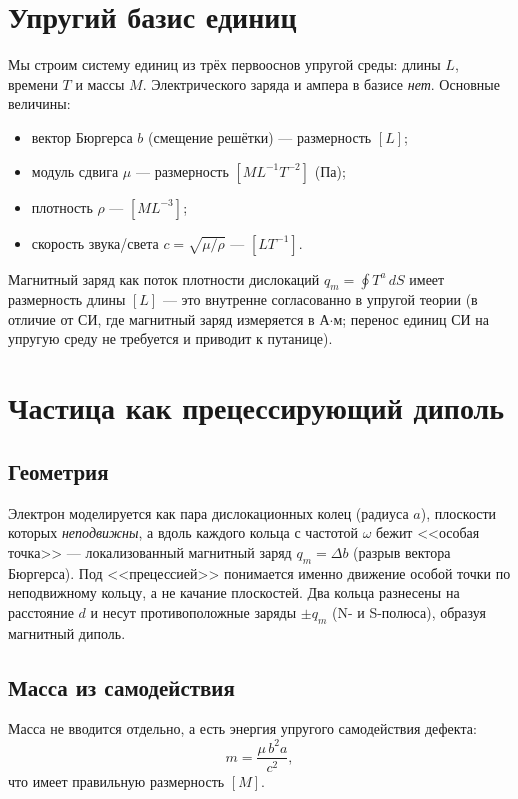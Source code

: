 \documentclass[12pt,a4paper]{article}
\begin{document}
\section{Упругий базис единиц}
\label{sec:units}
Мы строим систему единиц из трёх первооснов упругой среды: длины $L$, времени $T$
и массы $M$. Электрического заряда и ампера в базисе \emph{нет}. Основные величины:
\begin{itemize}[nosep]
\item вектор Бюргерса $b$ (смещение решётки) --- размерность $[L]$;
\item модуль сдвига $\mu$ --- размерность $[M L^{-1}T^{-2}]$ (Па);
\item плотность $\rho$ --- $[M L^{-3}]$;
\item скорость звука/света $c=\sqrt{\mu/\rho}$ --- $[L T^{-1}]$.
\end{itemize}
Магнитный заряд как поток плотности дислокаций $q_m=\oint T^a\,dS$ имеет
размерность длины $[L]$ --- это внутренне согласованно в упругой теории
(в отличие от СИ, где магнитный заряд измеряется в А$\cdot$м; перенос единиц СИ
на упругую среду не требуется и приводит к путанице).

\section{Частица как прецессирующий диполь}
\label{sec:particle}

\subsection{Геометрия}
Электрон моделируется как пара дислокационных колец (радиуса $a$), плоскости
которых \emph{неподвижны}, а вдоль каждого кольца с частотой $\omega$ бежит
<<особая точка>> --- локализованный магнитный заряд $q_m=\Delta b$ (разрыв
вектора Бюргерса). Под <<прецессией>> понимается именно движение особой точки по
неподвижному кольцу, а не качание плоскостей. Два кольца разнесены на расстояние
$d$ и несут противоположные заряды $\pm q_m$ (N- и S-полюса), образуя магнитный
диполь.

\subsection{Масса из самодействия}
Масса не вводится отдельно, а есть энергия упругого самодействия дефекта:
\begin{equation}
m = \frac{\mu\, b^2 a}{c^2},
\end{equation}
что имеет правильную размерность $[M]$.
\end{document}
